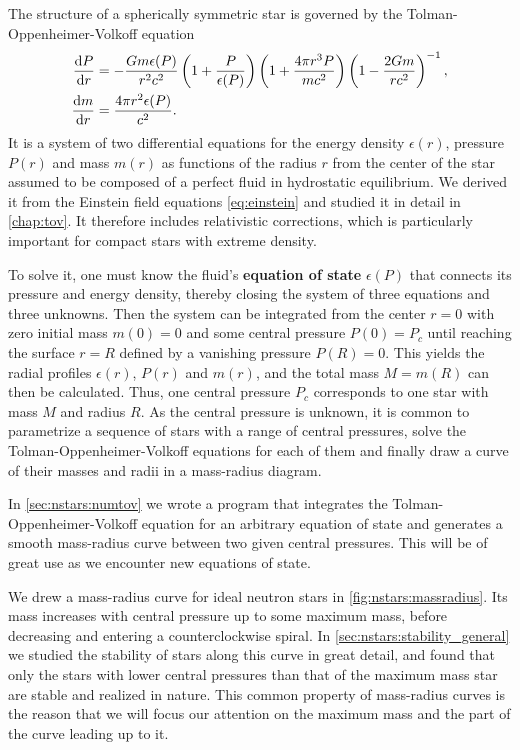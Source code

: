 The structure of a spherically symmetric star is governed by the Tolman-Oppenheimer-Volkoff equation
\begin{subequations}
\begin{align}
	\odv{P}{r} &= -\frac{G m \epsilon(P)}{r^2 c^2} \left( 1 + \frac{P}{\epsilon(P)} \right) \left( 1 + \frac{4 \pi r^3 P}{m c^2} \right) \left( 1 - \frac{2 G m}{r c^2} \right)^{-1} , \\
	\odv{m}{r} &= \frac{4 \pi r^2 \epsilon(P)}{c^2} .
\end{align}%
\label{eq:master_intro:tov}%
\end{subequations}%
It is a system of two differential equations for the energy density $\epsilon(r)$, pressure $P(r)$ and mass $m(r)$ as functions of the radius $r$ from the center of the star assumed to be composed of a perfect fluid in hydrostatic equilibrium.
We derived it from the Einstein field equations \eqref{eq:einstein} and studied it in detail in \cref{chap:tov}.
It therefore includes relativistic corrections, which is particularly important for compact stars with extreme density.

To solve it, one must know the fluid's \textbf{equation of state} $\epsilon(P)$ that connects its pressure and energy density, thereby closing the system of three equations and three unknowns.
Then the system can be integrated from the center $r=0$ with zero initial mass $m(0) = 0$ and some central pressure $P(0) = P_c$ until reaching the surface $r=R$ defined by a vanishing pressure $P(R) = 0$.
This yields the radial profiles $\epsilon(r)$, $P(r)$ and $m(r)$, and the total mass $M = m(R)$ can then be calculated.
Thus, one central pressure $P_c$ corresponds to one star with mass $M$ and radius $R$.
As the central pressure is unknown,
it is common to parametrize a sequence of stars with a range of central pressures,
solve the Tolman-Oppenheimer-Volkoff equations for each of them and finally draw a curve of their masses and radii in a mass-radius diagram.

In \cref{sec:nstars:numtov} we wrote a program that integrates the Tolman-Oppenheimer-Volkoff equation for an arbitrary equation of state and generates a smooth mass-radius curve between two given central pressures.
This will be of great use as we encounter new equations of state.

We drew a mass-radius curve for ideal neutron stars in \cref{fig:nstars:massradius}.
Its mass increases with central pressure up to some maximum mass, before decreasing and entering a counterclockwise spiral.
In \cref{sec:nstars:stability_general} we studied the stability of stars along this curve in great detail,
and found that only the stars with lower central pressures than that of the maximum mass star are stable and realized in nature.
This common property of mass-radius curves is the reason that we will focus our attention on the maximum mass and the part of the curve leading up to it.

